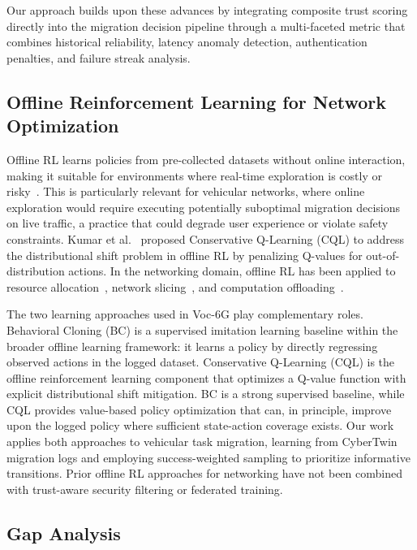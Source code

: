\documentclass[10pt,letterpaper]{article}
\providecommand{\VocSixG}{Voc-6G}
\begin{document}
Our approach builds upon these advances by integrating composite trust scoring directly into the migration decision pipeline through a multi-faceted metric that combines historical reliability, latency anomaly detection, authentication penalties, and failure streak analysis.

\subsection*{Offline Reinforcement Learning for Network Optimization}

Offline RL learns policies from pre-collected datasets without online interaction, making it suitable for environments where real-time exploration is costly or risky~\cite{levine2020offline, fujimoto2019off}. This is particularly relevant for vehicular networks, where online exploration would require executing potentially suboptimal migration decisions on live traffic, a practice that could degrade user experience or violate safety constraints. Kumar et al.~\cite{kumar2020cql} proposed Conservative Q-Learning (CQL) to address the distributional shift problem in offline RL by penalizing Q-values for out-of-distribution actions. In the networking domain, offline RL has been applied to resource allocation~\cite{wang2021offline}, network slicing~\cite{wang2021intelligent}, and computation offloading~\cite{chen2021offline}.

The two learning approaches used in \VocSixG{} play complementary roles. Behavioral Cloning (BC) is a supervised imitation learning baseline within the broader offline learning framework: it learns a policy by directly regressing observed actions in the logged dataset. Conservative Q-Learning (CQL) is the offline reinforcement learning component that optimizes a Q-value function with explicit distributional shift mitigation. BC is a strong supervised baseline, while CQL provides value-based policy optimization that can, in principle, improve upon the logged policy where sufficient state-action coverage exists. Our work applies both approaches to vehicular task migration, learning from CyberTwin migration logs and employing success-weighted sampling to prioritize informative transitions. Prior offline RL approaches for networking have not been combined with trust-aware security filtering or federated training.

\subsection*{Gap Analysis}
\end{document}
